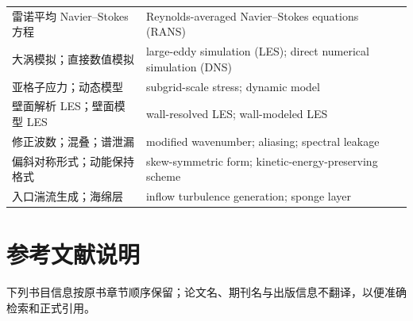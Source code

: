 \documentclass[12pt,a4paper,openany,fontset=none]{ctexbook}
\begin{document}
\begin{longtable}{p{}p{}}
雷诺平均 Navier--Stokes 方程 & Reynolds-averaged Navier--Stokes equations (RANS)\\
大涡模拟；直接数值模拟 & large-eddy simulation (LES); direct numerical simulation (DNS)\\
亚格子应力；动态模型 & subgrid-scale stress; dynamic model\\
壁面解析 LES；壁面模型 LES & wall-resolved LES; wall-modeled LES\\
修正波数；混叠；谱泄漏 & modified wavenumber; aliasing; spectral leakage\\
偏斜对称形式；动能保持格式 & skew-symmetric form; kinetic-energy-preserving scheme\\
入口湍流生成；海绵层 & inflow turbulence generation; sponge layer\\
\bottomrule
\end{longtable}

\chapter*{参考文献说明}
下列书目信息按原书章节顺序保留；论文名、期刊名与出版信息不翻译，以便准确检索和正式引用。

\begingroup
\small
\sloppy
\setlength{\parskip}{0.28em}
\end{document}
